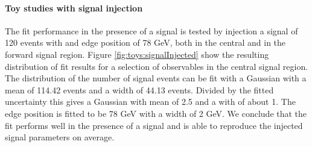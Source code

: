 \paragraph{Toy studies with signal injection}
The fit performance in the presence of a signal is tested by injection a signal of 120 events with and edge position of 78 GeV, both in the central and in the forward signal region. Figure \ref{fig:toys:signalInjected} show the resulting distribution of fit results for a selection of observables in the central signal region. The distribution of the number of signal events can be fit with a Gaussian with a mean of 114.42 events and a width of 44.13 events. Divided by the fitted uncertainty this gives a Gaussian with mean of 2.5 and a with of about 1. The edge position is fitted to be 78 GeV with a width of 2 GeV. We conclude that the fit performs well in the presence of a signal and is able to reproduce the injected signal parameters on average. 

